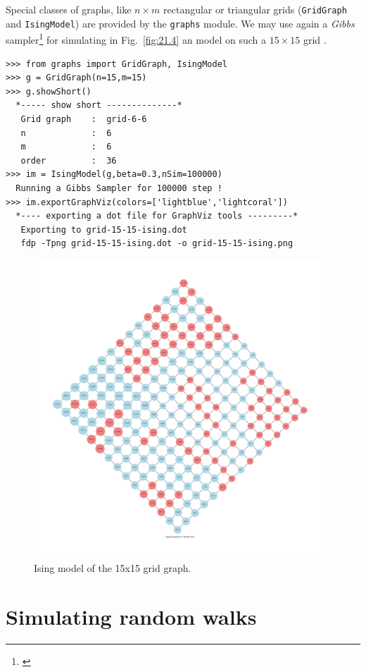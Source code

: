 Special classes of graphs, like $n \times m$ rectangular or triangular grids (\texttt{GridGraph} and \texttt{IsingModel}) are provided by the \texttt{graphs} module. We may use again a \emph{Gibbs} sampler\footnote{\citet{GEM-1984}} for simulating in Fig.~\vref{fig:21.4} an \Ising model on such a $15 \times 15$ grid \citep{ISI-1925}.
\begin{lstlisting}[caption={Simulating an Ising model on a the $15 \times 15$ rectangular grid},label=list:21.11]
>>> from graphs import GridGraph, IsingModel
>>> g = GridGraph(n=15,m=15)
>>> g.showShort()
  *----- show short --------------*
   Grid graph    :  grid-6-6
   n             :  6
   m             :  6
   order         :  36
>>> im = IsingModel(g,beta=0.3,nSim=100000)
  Running a Gibbs Sampler for 100000 step !
>>> im.exportGraphViz(colors=['lightblue','lightcoral'])
  *---- exporting a dot file for GraphViz tools ---------*
   Exporting to grid-15-15-ising.dot
   fdp -Tpng grid-15-15-ising.dot -o grid-15-15-ising.png
\end{lstlisting}
\begin{figure}[h]
\sidecaption
\includegraphics[width=11cm]{Figures/21-4-grid-15-15-ising.pdf}
\caption{Ising model of the 15x15 grid graph.} 
\label{fig:21.4}       %
\end{figure}

\section{Simulating \Metropolis random walks}
\label{sec:21.6}

